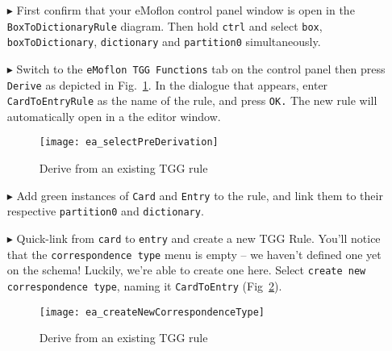 \begin{enumerate}
  
\item[$\blacktriangleright$] First confirm that your eMoflon control panel window is open in the \texttt{Box\-To\-Dictionary\-Rule} diagram. Then hold
\texttt{ctrl} and select \texttt{box}, \texttt{box\-To\-Dictionary}, \texttt{dictionary} and \texttt{partition0} simultaneously.
  
\item[$\blacktriangleright$] Switch to the \texttt{eMoflon TGG Functions} tab on the control panel then press \texttt{Derive} as depicted in
Fig.~\ref{fig:derive_from_tgg_rule}. In the dialogue that appears, enter \texttt{CardToEntryRule} as the name of the rule, and press \texttt{OK.} The new rule
will automatically open in a the editor window.

\begin{figure}[htbp]
\begin{center}
 \texttt{[image: ea\_selectPreDerivation]}
  \caption{Derive from an existing TGG rule}
  \label{fig:derive_from_tgg_rule}
\end{center}
\end{figure}
\FloatBarrier

\item[$\blacktriangleright$] Add green instances of \texttt{Card} and \texttt{Entry} to the rule, and link them to their respective \texttt{partition0} and
\texttt{dictionary}. 

\vspace{0.5cm}

\item[$\blacktriangleright$] Quick-link from \texttt{card} to \texttt{entry} and create a new TGG Rule. You'll notice that the \texttt{correspondence type} menu
is empty -- we haven't defined one yet on the schema! Luckily, we're able to create one here. Select \texttt{create new correspondence type}, naming it
\texttt{CardToEntry} (Fig~\ref{fig:newCorrespondenceDialogue}). 

\vspace{0.5cm}

\begin{figure}[htbp]
\begin{center}
 \texttt{[image: ea\_createNewCorrespondenceType]}
  \caption{Derive from an existing TGG rule}
  \label{fig:newCorrespondenceDialogue}
\end{center}
\end{figure}


\end{enumerate}
